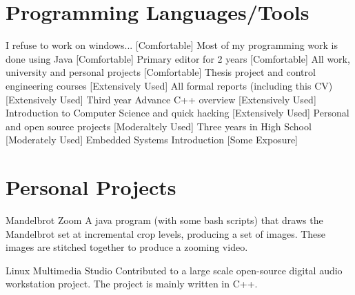 \documentclass[11pt,a4paper,sans]{moderncv}
\begin{document}

\section{Programming Languages/Tools}

{{\normalfont I refuse to work on windows...}}
{[Comfortable]}
{{\normalfont Most of my programming work is done using Java}}
{[Comfortable]}
{{\normalfont Primary editor for 2 years}}
{[Comfortable]}
{{\normalfont All work, university and personal projects}}
{[Comfortable]}
{{\normalfont Thesis project and control engineering courses}}
{[Extensively Used]}
{{\normalfont All formal reports (including this CV)}}
{[Extensively Used]}
{{\normalfont Third year Advance C++ overview}}
{[Extensively Used]}
{{\normalfont Introduction to Computer Science and quick hacking}}
{[Extensively Used]}
{{\normalfont Personal and open source projects}}
{[Moderaltely Used]}
{{\normalfont Three years in High School}}
{[Moderately Used]}
{{\normalfont Embedded Systems Introduction}}
{[Some Exposure]}


\section{Personal Projects}

{Mandelbrot Zoom}
{}
{}{}
{A java program (with some bash scripts) that draws the Mandelbrot set at
incremental crop levels, producing a set of images. These images are stitched
together to produce a zooming video.}

{Linux Multimedia Studio}
{}
{}{}
{Contributed to a large scale open-source digital audio workstation project. The
project is mainly written in C++.}
\end{document}
